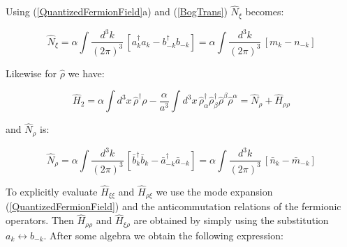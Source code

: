 \begin{doublespace}
Using (\ref{QuantizedFermionField}a) and (\ref{BogTrans}) $\hat N_\xi$ becomes:

\begin{equation}\label{xiNumberOp}
    \hat N_\xi = \alpha \int \frac{d^3k}{(2\pi)^3}\, \left[a^\dag_k a_k - b^\dag_{-k} b_{-k} \right]
                = \alpha \int \frac{d^3k}{(2\pi)^3}\, \left[m_k - n_{-k} \right]
\end{equation}

Likewise for $\hat\rho$ we have:

\begin{equation}
    \hat H_2 = \alpha \int d^3x\, \hat\rho^\dag\rho -
    \frac{\alpha}{a^3} \int d^3x\,
    \hat\rho^\dag_\alpha\hat\rho^\dag_\beta\hat\rho^\beta\hat\rho^\alpha
    = \hat N_\rho + \hat H_{\rho\rho}
\end{equation}

and $\hat N_\rho$ is:

\begin{equation}\label{rhoNumberOp}
    \hat N_\rho = \alpha \int \frac{d^3k}{(2\pi)^3}\, \left[\bar b^\dag_k \bar b_k - \bar a^\dag_{-k} \bar a_{-k} \right]
                = \alpha \int \frac{d^3k}{(2\pi)^3}\, \left[\bar n_k - \bar m_{-k} \right]
\end{equation}

To explicitly evaluate $\hat H_{\xi\xi}$ and $\hat H_{\rho\xi}$ we use the mode expansion
(\ref{QuantizedFermionField}) and the anticommutation relations of the fermionic operators. Then
$\hat H_{\rho\rho}$ and $\hat H_{\xi\rho}$ are obtained by simply using the substitution $ a_k
\leftrightarrow b_{-k}$. After some algebra we obtain the following expression:


\end{doublespace}
